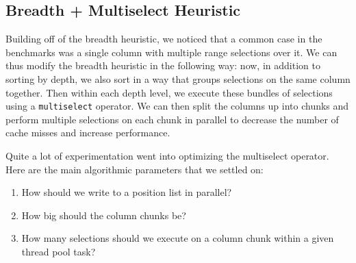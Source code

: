 \documentclass[a4paper, 12pt]{article}
\begin{document}
\subsection{Breadth + Multiselect Heuristic}

Building off of the breadth heuristic, we noticed that a common case in the benchmarks was a single column with multiple range selections over it. We can thus modify the breadth heuristic in the following way: now, in addition to sorting by depth, we also sort in a way that groups selections on the same column together. Then within each depth level, we execute these bundles of selections using a \texttt{multiselect} operator. We can then split the columns up into chunks and perform multiple selections on each chunk in parallel to decrease the number of cache misses and increase performance.

\medskip
Quite a lot of experimentation went into optimizing the multiselect operator. Here are the main algorithmic parameters that we settled on:

\begin{enumerate}
    \item How should we write to a position list in parallel?
    \item How big should the column chunks be?
    \item How many selections should we execute on a column chunk within a given thread pool task?
\end{enumerate}
\end{document}
